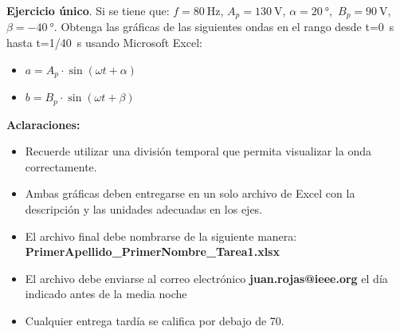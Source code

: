\documentclass[12pt]{article}
\begin{document}
\noindent\textbf{Ejercicio único}. Si se tiene que:  $f=\SI{80}{\hertz}$, $A_p=\SI{130}{\volt}$, $\alpha = \SI{20}{\degree}, $ $B_p=\SI{90}{\volt}$, $\beta = \SI{-40}{\degree}$. Obtenga las gráficas de las siguientes ondas en el rango desde t=\SI{0}{\second} hasta t=\SI{1/40}{\second}  usando Microsoft \textregistered Excel:
\begin{itemize}
    \item[] $a = A_p \cdot \sin(\omega t + \alpha )$
    \item[] $b = B_p \cdot \sin(\omega t + \beta )$
\end{itemize}
\noindent\textbf{Aclaraciones:}
\begin{itemize}
    \item Recuerde utilizar una división temporal que permita visualizar la onda correctamente.
    \item Ambas gráficas deben entregarse en un solo archivo de Excel con la descripción y las unidades adecuadas en los ejes.
    \item El archivo final debe nombrarse de la siguiente manera:\\ \textbf{PrimerApellido\_PrimerNombre\_Tarea1.xlsx}
    \item El archivo debe enviarse al correo electrónico \textbf{juan.rojas@ieee.org} el día indicado antes de la media noche
    \item Cualquier entrega tardía se califica por debajo de 70. 
\end{itemize}
\end{document}
